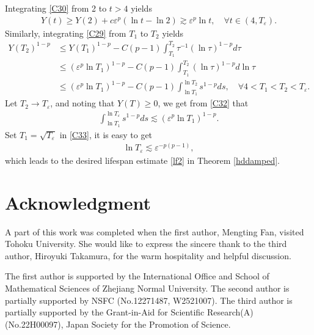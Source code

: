 \documentclass[review]{elsarticle}
\newcommand{\e}{\varepsilon}
\begin{document}
Integrating \eqref{C30} from 2 to $t>4$ yields
\begin{equation}\label{C31}
\begin{aligned}
Y(t)\geq Y(2)+c\e^p(\ln t-\ln 2)\gtrsim\e^p\ln t, \quad\forall t\in(4,T_\e).
\end{aligned}
\end{equation}
Similarly, integrating \eqref{C29} from $T_1$ to $T_2$ yields
\begin{equation}\label{C32}
\begin{aligned}
Y(T_2)^{1-p}&\leq Y(T_1)^{1-p}-C(p-1)\int_{T_1}^{T_2}\tau^{-1}(\ln \tau)^{1-p}d\tau\\
&\leq (\e^p\ln T_1)^{1-p}-C(p-1)\int_{T_1}^{T_2}(\ln\tau)^{1-p}d\ln\tau\\
&\leq  (\e^p\ln T_1)^{1-p}-C(p-1)\int_{\ln T_1}^{\ln T_2}s^{1-p}ds,\quad \forall 4<T_1<T_2<T_\e.
\end{aligned}
\end{equation}
Let $T_2\rightarrow T_\e$, and noting that $Y(T)\ge 0$, we get from \eqref{C32} that
\begin{equation}\label{C33}
\begin{aligned}
\int_{\ln T_1}^{\ln T_\e}s^{1-p}ds\lesssim (\e^p\ln T_1)^{1-p}.
\end{aligned}
\end{equation}
Set $T_1=\sqrt{T_\e}$ in \eqref{C33}, it is easy to get
\begin{equation}\label{C34}
\begin{aligned}
\ln T_\e\lesssim \e^{-p(p-1)},
\end{aligned}
\end{equation}
which leads to the desired lifespan estimate \eqref{lf2} in Theorem \ref{hddamped}.
\section*{Acknowledgment}
\par
A part of this work was completed when the first author, Mengting Fan, visited Tohoku University.
She would like to express the sincere thank to the third author, Hiroyuki Takamura,
for the warm hospitality and helpful discussion.
\par
The first author is supported by the International Office and School of Mathematical Sciences of Zhejiang Normal University. The second author is partially supported by NSFC (No.12271487, W2521007).
The third author is partially supported by the Grant-in-Aid for Scientific Research(A) (No.22H00097), Japan Society for the Promotion of Science.
\end{document}
